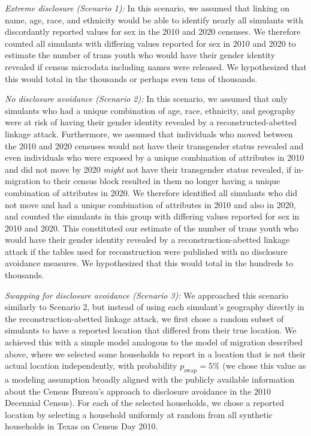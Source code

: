 \documentclass{jpc} %
\theoremstyle{plain}\newtheorem{satz}[thm]{Satz} %
\begin{document}
\emph{Extreme disclosure (Scenario 1):} In this scenario, we assumed that linking on name, age, race, and ethnicity would be able to identify nearly all simulants with discordantly reported values for sex in the 2010 and 2020 censuses.  We therefore counted all simulants with differing values reported for sex in 2010 and 2020 to estimate the number of trans youth who would have their gender identity revealed if census microdata including names were released.  We hypothesized that this would total in the thousands or perhaps even tens of thousands.

\emph{No disclosure avoidance (Scenario 2):} In this scenario, we assumed that only simulants who had a unique combination of age, race, ethnicity, and geography were at risk of having their gender identity revealed by a reconstructed-abetted linkage attack.  Furthermore, we assumed that individuals who moved between the 2010 and 2020 censuses would not have their transgender status revealed and even individuals who were exposed by a unique combination of attributes in 2010 and did not move by 2020 \emph{might} not have their transgender status revealed, if in-migration to their census block resulted in them no longer having a unique combination of attributes in 2020.  We therefore identified all simulants who did not move and had a unique combination of attributes in 2010 and also  in 2020, and counted the simulants in this group with differing values reported for sex in 2010 and 2020.  This constituted our estimate of the number of trans youth who would have their gender identity revealed by a reconstruction-abetted linkage attack if the tables used for reconstruction were published with no disclosure avoidance measures.
We hypothesized that this would total in the hundreds to thousands.

\emph{Swapping for disclosure avoidance (Scenario 3):} We approached this scenario similarly to Scenario 2, but instead of using each simulant's geography directly in the reconstruction-abetted linkage attack, we first chose a random subset of simulants to have a reported location that differed from their true location.  
We achieved this with a simple model analogous to the model of migration described above, where we selected some households to report in a location that is not their actual location independently, with probability $p_\text{swap} = 5\%$ (we chose this value as a modeling assumption broadly aligned with the  publicly available information about the Census Bureau's approach to disclosure avoidance in the 2010 Decennial Census).  For each of the selected households, we chose a reported location by selecting a household uniformly at random from all synthetic households in Texas on Census Day 2010.
\end{document}
